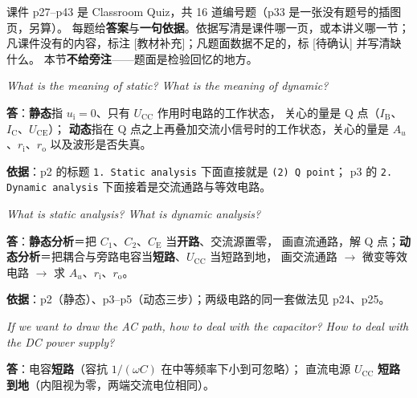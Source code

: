 \documentclass[11pt]{ctexart}
\begin{document}



课件 p27--p43 是 Classroom Quiz，共 16 道编号题（p33 是一张没有题号的插图页，另算）。
每题给\textbf{答案}与\textbf{一句依据}。依据写清是课件哪一页，或本讲义哪一节；
凡课件没有的内容，标注 [教材补充]；凡题面数据不足的，标 [待确认] 并写清缺什么。
本节\textbf{不给旁注}——题面是检验回忆的地方。


\textit{What is the meaning of static? What is the meaning of dynamic?}

\textbf{答}：\textbf{静态}指 $u_{\mathrm{i}}=0$、只有 $U_{\mathrm{CC}}$ 作用时电路的工作状态，
关心的量是 Q 点（$I_{\mathrm{B}}$、$I_{\mathrm{C}}$、$U_{\mathrm{CE}}$）；
\textbf{动态}指在 Q 点之上再叠加交流小信号时的工作状态，关心的量是 $A_u$、$r_{\mathrm{i}}$、$r_{\mathrm{o}}$ 以及波形是否失真。

\textbf{依据}：p2 的标题 \texttt{1. Static analysis} 下面直接就是 \texttt{(2) Q point}；
p3 的 \texttt{2. Dynamic analysis} 下面接着是交流通路与等效电路。


\textit{What is static analysis? What is dynamic analysis?}

\textbf{答}：\textbf{静态分析}＝把 $C_1$、$C_2$、$C_{\mathrm{E}}$ 当\textbf{开路}、交流源置零，
画直流通路，解 Q 点；\textbf{动态分析}＝把耦合与旁路电容当\textbf{短路}、$U_{\mathrm{CC}}$ 当短路到地，
画交流通路 $\to$ 微变等效电路 $\to$ 求 $A_u$、$r_{\mathrm{i}}$、$r_{\mathrm{o}}$。

\textbf{依据}：p2（静态）、p3--p5（动态三步）；两级电路的同一套做法见 p24、p25。


\textit{If we want to draw the AC path, how to deal with the capacitor? How to deal with the DC power supply?}

\textbf{答}：电容\textbf{短路}（容抗 $1/(\omega C)$ 在中等频率下小到可忽略）；
直流电源 $U_{\mathrm{CC}}$ \textbf{短路到地}（内阻视为零，两端交流电位相同）。
\end{document}
